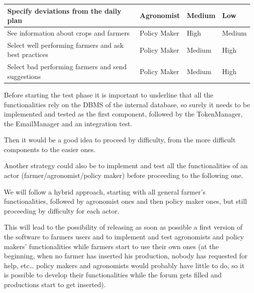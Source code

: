 \documentclass{article}
\begin{document}
\begin{longtable}{|p{8cm}|p{2.5cm}|p{2.5cm}|p{}|}
        \hline
        \rule[-4mm]{0mm}{0.8cm}
            Specify deviations from the daily plan                  & Agronomist    & Medium                            & Low                   \\
        \hline
        \rule[-4mm]{0mm}{0.8cm}
            See information about crops and farmers                 & Policy Maker  & High                              & Medium                   \\
        \hline
        \rule[-4mm]{0mm}{0.8cm}
            Select well performing farmers and ask best practices   & Policy Maker  & Medium                            & High                   \\
        \hline
        \rule[-4mm]{0mm}{0.8cm}
            Select bad performing farmers and send suggestions      & Policy Maker  & Medium                            & High                   \\
        \hline
    \end{longtable}


    \newpage
    
    Before starting the test phase it is important to underline that all the functionalities rely on the DBMS of the internal database, so surely it needs to be implemented and tested as the first component, followed by the TokenManager, the EmailManager and an integration test. \par
    
    Then it would be a good idea to proceed by difficulty, from the more difficult components to the easier ones. \par 
    
    Another strategy could also be to implement and test all the functionalities of an actor (farmer/agronomist/policy maker) before proceeding to the following one. \par
    
    We will follow a hybrid approach, starting with all general farmer’s functionalities, followed by agronomist ones and then policy maker ones, but still proceeding by difficulty for each actor. \par
    
    This will lead to the possibility of releasing as soon as possible a first version of the software to farmers users and to implement and test agronomists and policy makers’ functionalities while farmers start to use their own ones (at the beginning, when no farmer has inserted his production, nobody has requested for help, etc… policy makers and agronomists would probably have little to do, so it is possible to develop their functionalities while the forum gets filled and productions start to get inserted). \par
\end{document}
